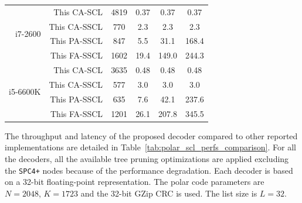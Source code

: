 \begin{table}
\begin{tabular}{r | r c  c c c}
    \multirow{4}{*}{i7-2600}
    & This CA-SCL                    &  4819                             &  0.37           &   0.37          &   0.37          \\
    & This CA-SSCL                   &   770                             &  2.3            &   2.3           &   2.3           \\
    & This PA-SSCL                   &   847                             &  5.5            &  31.1           & 168.4           \\
    & This FA-SSCL                   &  1602                             & 19.4            & 149.0           & 244.3           \\
    \hline
    \multirow{4}{*}{i5-6600K}
    & This CA-SCL                    &  3635                             &  0.48           &   0.48          &   0.48          \\
    & This CA-SSCL                   &   577                             &  3.0            &   3.0           &   3.0           \\
    & This PA-SSCL                   &   635                             &  7.6            &  42.1           & 237.6           \\
    & This FA-SSCL                   &  1201                             & 26.1            & 207.8           & 345.5           \\
  \end{tabular}
\end{table}

The throughput and latency of the proposed decoder compared to other reported
implementations are detailed in Table~\ref{tab:polar_scl_perfs_comparison}. For
all the decoders, all the available tree pruning optimizations are applied
excluding the \texttt{SPC4+} nodes because of the performance degradation. Each
decoder is based on a 32-bit floating-point representation. The polar code
parameters are $N=2048$, $K=1723$ and the 32-bit GZip CRC is used. The list size
is $L=32$.

